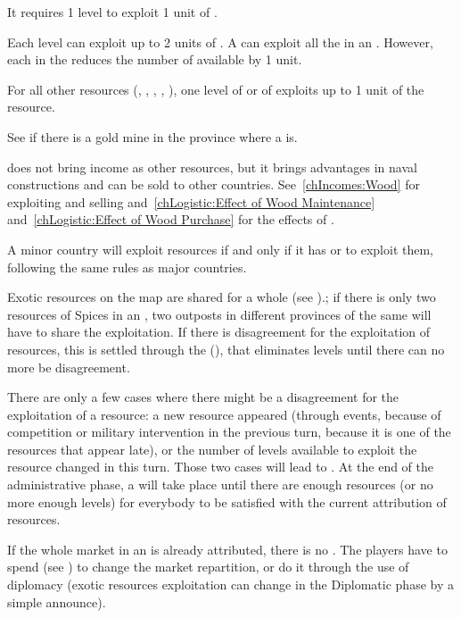 \aparag[Fish.] It requires 1 \COL level to exploit 1 unit of .

\aparag[Fur.]
\bparag Each \TP level can exploit up to 2 units of .
\bparag A \COL can exploit all the  in an \Area. However, each
\COL\faceplus in the \Area reduces the number of available  by 1
unit.

 For all other resources (,
, , , ), one level of \COL or of
\TP exploits up to 1 unit of the resource.

\aparag[Gold.] See  if there is a gold mine in
the province where a \COL is.

\aparag[Wood.]  does not bring income as other resources, but
it brings advantages in naval constructions and can be sold to other
countries. See~\ref{chIncomes:Wood} for exploiting and selling
 and~\ref{chLogistic:Effect of Wood Maintenance}
and~\ref{chLogistic:Effect of Wood Purchase} for the effects of
.

\aparag A \ROTW minor country will exploit resources if and only if it has \TP
or \COL to exploit them, following the same rules as major countries.

\aparag Exotic resources on the \ROTW map are shared for a whole \Area (see
).; if there is only two resources of Spices in
an \Area, two outposts in different provinces of the same \Area will have to
share the exploitation.
\bparag If there is disagreement for the exploitation of resources, this
is settled through the 
(), that eliminates levels until
there can no more be disagreement.

 There are only a few cases where there might be a
disagreement for the exploitation of a resource: a new resource appeared
(through events, because of competition or military intervention in the
previous turn, because it is one of the resources that appear late), or the
number of levels available to exploit the resource changed in this turn.
\bparag Those two cases will lead to . At the end
of the administrative phase, a  will take place until there
are enough resources (or no more enough levels) for everybody to be satisfied
with the current attribution of resources.

\bparag If the whole market in an \Area is already attributed, there is
no . The players have to spend
 (see )
to change the market repartition, or do it through the use of diplomacy
(exotic resources exploitation can change in the Diplomatic phase by a
simple announce).

